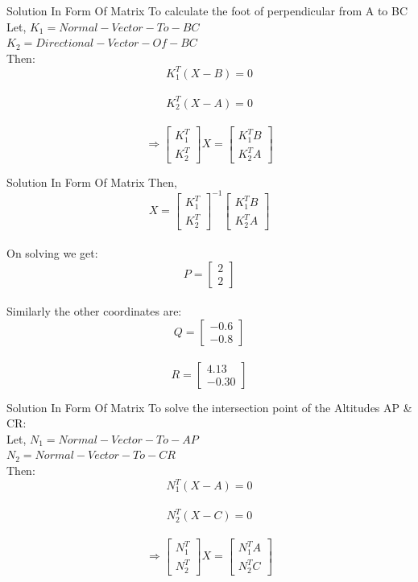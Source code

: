 \documentclass{beamer}
\begin{document}
\begin{frame}{Solution In Form Of Matrix}
To calculate the foot of perpendicular from A to BC
\\
Let, $K_{1} = Normal-Vector-To-BC$
\\
     $K_{2} = Directional-Vector-Of-BC$
\\
Then:
\[K_{1}^T(X - B) = 0\]
\\
\[K_{2}^T(X - A) = 0\]    
\\
\[\Rightarrow
\begin{bmatrix}K_{1}^T \\ K_{2}^T \end{bmatrix}X = \begin{bmatrix}K_{1}^TB \\ K_{2}^TA \end{bmatrix}\]
\end{frame}
\begin{frame}{Solution In Form Of Matrix}
Then,
\\
\[X = \begin{bmatrix}K_{1}^T \\ K_{2}^T \end{bmatrix}^{-1}\begin{bmatrix}K_{1}^TB \\ K_{2}^TA \end{bmatrix}\]
\\
On solving we get:
\[P = \begin{bmatrix}2 \\ 2 \end{bmatrix}\]
\\
Similarly the other coordinates are:
\[Q = \begin{bmatrix}-0.6 \\ -0.8 \end{bmatrix}\]
\\
\[R = \begin{bmatrix}4.13 \\ -0.30 \end{bmatrix}\]
\end{frame}
\begin{frame}{Solution In Form Of Matrix}
To solve the intersection point of the Altitudes AP \& CR:
\\
Let,
$N_{1} = {Normal-Vector-To-AP}$
\\
$N_{2} = {Normal-Vector-To-CR}$
\\
Then:
\[N_{1}^T(X - A) = 0\]
\\
\[N_{2}^T(X - C) = 0\]    
\\
\[\Rightarrow
\begin{bmatrix}N_{1}^T \\ N_{2}^T \end{bmatrix}X = \begin{bmatrix}N_{1}^TA \\ N_{2}^TC \end{bmatrix}\]

\end{frame}
\end{document}

